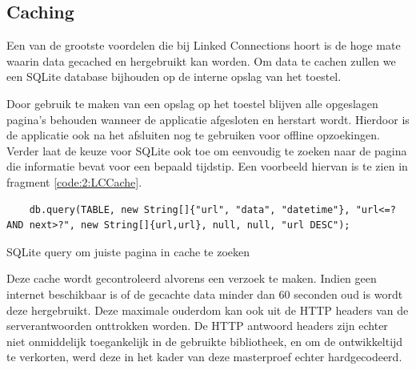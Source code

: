 \subsection{Caching}
Een van de grootste voordelen die bij Linked Connections hoort is de hoge mate waarin data gecached en hergebruikt kan worden. Om data te cachen zullen we een SQLite database bijhouden op de interne opslag van het toestel.

Door gebruik te maken van een opslag op het toestel blijven alle opgeslagen pagina's behouden wanneer de applicatie afgesloten en herstart wordt. Hierdoor is de applicatie ook na het afsluiten nog te gebruiken voor offline opzoekingen. Verder laat de keuze voor SQLite ook toe om eenvoudig te zoeken naar de pagina die informatie bevat voor een bepaald tijdstip. Een voorbeeld hiervan is te zien in fragment \ref{code:2:LCCache}.

\begin{code}[h]
	\begin{verbatim}
    db.query(TABLE, new String[]{"url", "data", "datetime"}, "url<=? AND next>?", new String[]{url,url}, null, null, "url DESC");
	\end{verbatim}
	\caption[Zoeken van pagina's in offline cache]{SQLite query om juiste pagina in cache te zoeken}
	\label{code:2:LCCache}
\end{code}

Deze cache wordt gecontroleerd alvorens een verzoek te maken. Indien geen internet beschikbaar is of de gecachte data minder dan 60 seconden oud is wordt deze hergebruikt. Deze maximale ouderdom kan ook uit de HTTP headers van de serverantwoorden onttrokken worden. De HTTP antwoord headers zijn echter niet onmiddelijk toegankelijk in de gebruikte bibliotheek, en om de ontwikkeltijd te verkorten, werd deze in het kader van deze masterproef echter hardgecodeerd.

